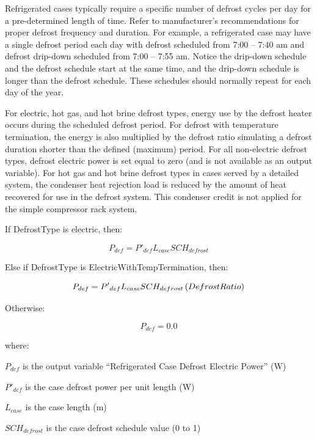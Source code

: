 Refrigerated cases typically require a specific number of defrost cycles per day for a pre-determined length of time. Refer to manufacturer's recommendations for proper defrost frequency and duration. For example, a refrigerated case may have a single defrost period each day with defrost scheduled from 7:00 -- 7:40 am and defrost drip-down scheduled from 7:00 -- 7:55 am. Notice the drip-down schedule and the defrost schedule start at the same time, and the drip-down schedule is longer than the defrost schedule. These schedules should normally repeat for each day of the year.

For electric, hot gas, and hot brine defrost types, energy use by the defrost heater occurs during the scheduled defrost period. For defrost with temperature termination, the energy is also multiplied by the defrost ratio simulating a defrost duration shorter than the defined (maximum) period. For all non-electric defrost types, defrost electric power is set equal to zero (and is not available as an output variable). For hot gas and hot brine defrost types in cases served by a detailed system, the condenser heat rejection load is reduced by the amount of heat recovered for use in the defrost system. This condenser credit is not applied for the simple compressor rack system.

If DefrostType is electric, then:

\begin{equation}
  P_{def} = {P'}_{def} L_{case} SCH_{defrost} 
\end{equation}

Else if DefrostType is ElectricWithTempTermination, then:

\begin{equation}
  P_{def} = {P'}_{def} L_{case} SCH_{defrost} \left(DefrostRatio\right)
\end{equation}

Otherwise:

\begin{equation}
  P_{def} = 0.0
\end{equation}

where:

\({P_{def}}\) is the output variable ``Refrigerated Case Defrost Electric Power'' (W)

\({P'}_{def}\) is the case defrost power per unit length (W)

\({L_{case}}\) is the case length (m)

\(SC{H_{defrost}}\) is the case defrost schedule value (0 to 1)

